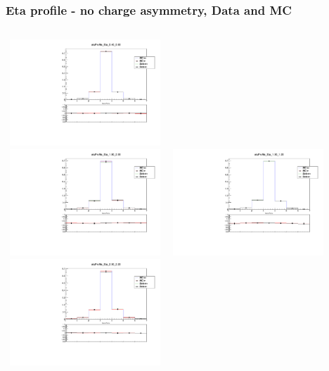 \documentclass{beamer}
\begin{document}
\begin{frame}
\frametitle{Eta profile - no charge asymmetry, Data and MC}

\begin{columns}[t]
\centering
\includegraphics[width=6cm,height=4cm]{etaProfileDataMC_Eta_4_6.pdf}\\
\includegraphics[width=6cm,height=4cm]{etaProfileDataMC_Eta_18_20.pdf}
\centering
\includegraphics[width=6cm,height=4cm]{etaProfileDataMC_Eta_10_12.pdf}\\
\includegraphics[width=6cm,height=4cm]{etaProfileDataMC_Eta_20_22.pdf}
\end{columns}
\end{frame}
\end{document}
